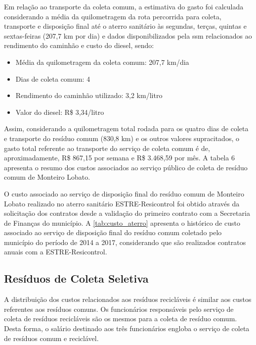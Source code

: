 	Em relação ao transporte da coleta comum, a estimativa do gasto foi calculada considerando a média da quilometragem da rota percorrida para coleta, transporte e disposição final até o aterro sanitário às segundas, terças, quintas e sextas-feiras (207,7 km por dia) e dados disponibilizados pela \gls{ssm} relacionados ao rendimento do caminhão e custo do diesel, sendo:
	
	\begin{itemize}
		\item Média da quilometragem da coleta comum: 207,7 km/dia
		\item Dias de coleta comum: 4
		\item Rendimento do caminhão utilizado: 3,2 km/litro
		\item Valor do diesel: R\$ 3,34/litro
	\end{itemize} 

	Assim, considerando a quilometragem total rodada para os quatro dias de coleta e transporte do resíduo comum (830,8 km) e os outros valores supracitados, o gasto total referente ao transporte do serviço de coleta comum é de, aproximadamente, R\$ 867,15 por semana e R\$ 3.468,59 por mês. A tabela 6 apresenta o resumo dos custos associados ao serviço público de coleta de resíduo comum de Monteiro Lobato.

	
	
	
	O custo associado ao serviço de disposição final do resíduo comum de Monteiro Lobato realizado no aterro sanitário ESTRE-Resicontrol foi obtido através da solicitação dos contratos desde a validação do primeiro contrato com a Secretaria de Finanças do município. A \autoref{tab:custo_aterro} apresenta o histórico de custo associado ao serviço de disposição final do resíduo comum coletado pelo município do período de 2014 a 2017, considerando que são realizados contratos anuais com a ESTRE-Resicontrol.
	
	
	
	\subsection{Resíduos de Coleta Seletiva}
	A distribuição dos custos relacionados aos resíduos recicláveis é similar aos custos referentes aos resíduos comuns. Os funcionários responsáveis pelo serviço de coleta de resíduos recicláveis são os mesmos para a coleta de resíduo comum. Desta forma, o salário destinado aos três funcionários engloba o serviço de coleta de resíduos comum e reciclável.
	
